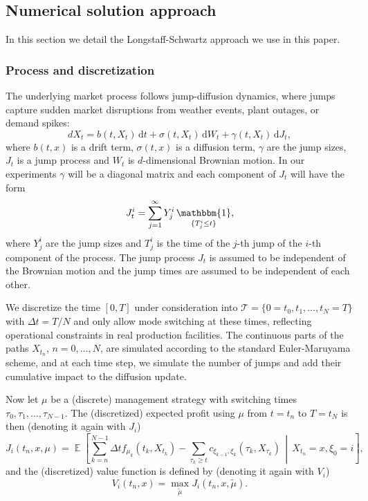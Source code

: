 \documentclass[11pt,reqno,a4paper]{amsart}
\theoremstyle{definition}
\numberwithin{equation}{section}
\newcommand{\Mid}{\,\middle\vert \,}
\newcommand{\diff}{\, \mathrm{d}}
\DeclareMathOperator{\E}{\mathbb{E}}
\DeclareMathOperator{\1}{\mathbbm{1}}
\begin{document}
\subsection{Numerical solution approach} \label{sec:setup:numerical}
In this section we detail the Longstaff-Schwartz approach we use in this paper.

\subsubsection{Process and discretization}
The underlying market process follows jump-diffusion dynamics, where jumps capture sudden market disruptions from weather events, plant outages, or demand spikes:
\begin{equation} \label{eq:process}
  dX_t = b(t,X_t) \diff t + \sigma(t,X_t) \diff W_t + \gamma(t,X_t) \diff J_t,
\end{equation}
where $b(t,x)$ is a drift term, $\sigma(t,x)$ is a diffusion term, $\gamma$ are the jump sizes, $J_t$ is a jump process and $W_t$ is $d$-dimensional Brownian motion. In our experiments $\gamma$ will be a diagonal matrix and each component of $J_t$ will have the form
\begin{equation} \label{eq:jump}
  J_t^i = \sum_{j=1}^{\infty} Y_j^i\1_{\{T_j^i \leq t\}},
\end{equation}
where $Y_j^i$ are the jump sizes and $T_j^i$ is the time of the $j$-th jump of the $i$-th component of the process. The jump process $J_t$ is assumed to be independent of the Brownian motion and the jump times are assumed to be independent of each other.

We discretize the time $[0,T]$ under consideration into $\mathcal T= \{0= t_0, t_1, \dots, t_N = T\}$ with $\Delta t = T/N$ and only allow mode switching at these times, reflecting operational constraints in real production facilities. The continuous parts of the paths $X_{t_n}$, $n=0,\dots,N$, are simulated according to the standard Euler-Maruyama scheme, and at each time step, we simulate the number of jumps and add their cumulative impact to the diffusion update.

Now let ${\mu}$ be a (discrete) management strategy with switching times $\tau_0,\tau_1,\dots,\tau_{N-1}$. The (discretized) expected profit using $\mu$ from $t=t_n$ to $T=t_N$ is then (denoting it again with $J_i$)
\begin{equation*}
  {J}_i(t_n,x,{\mu}) = \E \left[ \sum_{k=n}^{N-1}\Delta t f_{{\mu}_k}(t_k,X_{t_k}) - \sum_{\tau_k\geq t} c_{\xi_{k-1},\xi_{k}}(\tau_k,X_{\tau_k}) \Mid X_{t_n} = x,\xi_{0} = i \right],
\end{equation*}
and the (discretized) value function is defined by (denoting it again with $V_i$)
\begin{equation}\label{value:rec}
  V_i(t_n,x) =  \max_{\widetilde{\mu}}{J}_i(t_n,x,{\widetilde \mu}).
\end{equation}
\end{document}
